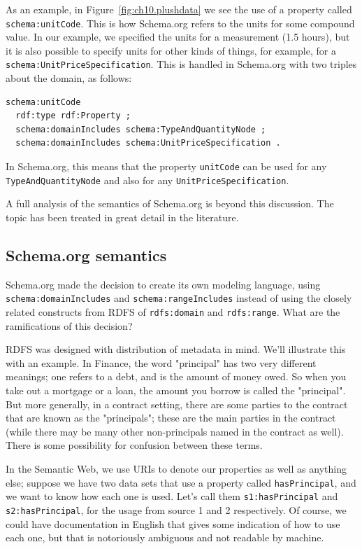 As an example, in Figure~\ref{fig:ch10.plushdata} we see the use of a property 
called \texttt{schema:unitCode}.  This is how Schema.org refers to the units
for some compound value.  In our example, we specified the units for a measurement
(1.5 hours), but it is also possible to specify units for other kinds of things, 
for example, for a \texttt{schema:UnitPriceSpecification}.  This is 
handled in Schema.org with two triples about the domain, as follows:

\begin{lstlisting}
schema:unitCode
  rdf:type rdf:Property ;
  schema:domainIncludes schema:TypeAndQuantityNode ;
  schema:domainIncludes schema:UnitPriceSpecification .
\end{lstlisting}

In Schema.org, this means that the property \texttt{unitCode} can be used for any 
\texttt{TypeAndQuantityNode} and also for any \texttt{UnitPriceSpecification}.

A full analysis of the semantics of Schema.org is beyond this discussion.  The topic has been treated in 
great detail in the literature. \cite{patel2014analyzing}

\subsection{Schema.org semantics}

Schema.org made the decision to create its own modeling language, using \texttt{schema:domainIncludes} and 
\texttt{schema:rangeIncludes} instead of using the closely related constructs from RDFS of \texttt{rdfs:domain} 
and \texttt{rdfs:range}.  What are the ramifications of this decision? 

RDFS was designed with distribution of metadata in mind.  We'll illustrate this with an example.  In Finance, the 
word "principal" has two very different meanings; one refers to a debt, and is the amount of money owed.  
So when you take out a mortgage or a loan, the amount you borrow is called the "principal".  But more
generally, in a contract setting, there are some parties to the contract that are known as the "principals";
these are the main parties in the contract (while there may be many other non-principals named in the contract
as well).  There is some possibility for confusion between these terms.  

In the Semantic Web, we use URIs to denote our properties as well as anything else; suppose we have two data sets 
that use a property called \texttt{hasPrincipal}, and we want to know how each one is used.  Let's call them
\texttt{s1:hasPrincipal} and \texttt{s2:hasPrincipal}, for the usage from source 1 and 2 respectively.   Of course, 
we could have documentation in English that gives some indication of how to use each one, but that is notoriously
ambiguous and not readable by machine.  

